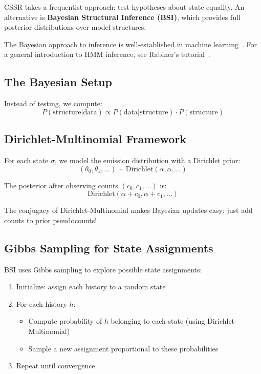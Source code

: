 \documentclass[11pt,a4paper]{article}
\theoremstyle{definition}
\theoremstyle{plain}
\begin{document}
CSSR takes a frequentist approach: test hypotheses about state equality. An alternative is \textbf{Bayesian Structural Inference (BSI)}, which provides full posterior distributions over model structures.

The Bayesian approach to inference is well-established in machine learning~\cite{bishop2006pattern}. For a general introduction to HMM inference, see Rabiner's tutorial~\cite{rabiner1989tutorial}.

\subsection{The Bayesian Setup}

Instead of testing, we compute:
\begin{equation}
    P(\text{structure} | \text{data}) \propto P(\text{data} | \text{structure}) \cdot P(\text{structure})
\end{equation}

\subsection{Dirichlet-Multinomial Framework}

For each state $\sigma$, we model the emission distribution with a Dirichlet prior:
\begin{equation}
    (\theta_0, \theta_1, \ldots) \sim \text{Dirichlet}(\alpha, \alpha, \ldots)
\end{equation}

The posterior after observing counts $(c_0, c_1, \ldots)$ is:
\begin{equation}
    \text{Dirichlet}(\alpha + c_0, \alpha + c_1, \ldots)
\end{equation}

\begin{keyidea}
The conjugacy of Dirichlet-Multinomial makes Bayesian updates easy: just add counts to prior pseudocounts!
\end{keyidea}

\subsection{Gibbs Sampling for State Assignments}

BSI uses Gibbs sampling to explore possible state assignments:

\begin{enumerate}
    \item Initialize: assign each history to a random state
    \item For each history $h$:
    \begin{itemize}
        \item Compute probability of $h$ belonging to each state (using Dirichlet-Multinomial)
        \item Sample a new assignment proportional to these probabilities
    \end{itemize}
    \item Repeat until convergence
\end{enumerate}
\end{document}
